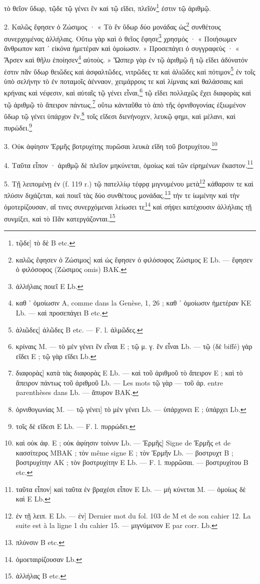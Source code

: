 \documentclass[a4paper, 11pt, oneside, polutonikogreek, french]{article}
\begin{document}
τὸ θεῖον ὕδωρ, τῷδε τῷ γένει ἓν καὶ τῷ εἴδει, πλεῖόν\footnote{τῷδε] τὸ δὲ B etc.} ἐστιν τῷ ἀριθμῷ.

2. Καλῶς ἔφησεν ὁ Ζώσιμος · « Τὸ ἓν ὕδωρ δύο μονάδας ὡς\footnote{καλῶς ἔφησεν ὁ Ζώσιμος] καὶ ὡς ἔφησεν ὁ φιλόσοφος Ζώσιμος E Lb. --- ἔφησεν ὁ φιλόσοφος (Ζώσιμος omis) BAK.} συνθέτους συνερχομένας ἀλλήλαις. Οὕτω γὰρ καὶ ὁ θεῖος ἔφησε\footnote{ἀλλήλαις ποιεῖ E Lb.} χρησμός · « Ποιήσωμεν ἄνθρωπον κατ ᾽ εἰκόνα ἡμετέραν καὶ ὁμοίωσιν. » Προσεπάγει ὁ συγγραφεὺς · « Ἄρσεν καὶ θῆλυ ἐποίησεν\footnote{καθ ᾽ ὁμοίωσιν A, comme dans la Genèse, 1, 26 ; καθ ᾽ ὁμοίωσιν ἡμετέραν KE Lb. --- καὶ προσεπάγει B etc.} αὐτοὺς. » Ὥσπερ γὰρ ἐν τῷ ἀριθμῷ ἢ τῷ εἴδει ἀδύνατόν ἐστιν πᾶν ὕδωρ θειῶδες καὶ ἀσφαλτῶδες, νιτρῶδες τε καὶ ἁλιῶδες καὶ πότιμον\footnote{ἁλιῶδες] ἁλῶδες B etc. --- F. l. ἁλμῶδες.} ἐν τοῖς ὑπὸ σελήνην τὸ ἐν ποταμοῖς ἀένναον, χειμάρροις τε καὶ λίμναις καὶ θαλάσσαις καὶ κρήναις καὶ νέφεσιν, καὶ αὐταῖς τῷ γένει εἶναι,\footnote{κρίναις M. --- τὸ μὲν γένει ἓν εἶναι E ; τῷ μ. γ. ἓν εἶναι Lb. --- τῷ (δὲ biffé) γὰρ εἴδει E ; τῷ γὰρ εἴδει Lb.} τῷ εἴδει πολλαχῶς ἔχει διαφορὰς καὶ τῷ ἀριθμῷ τὸ ἄπειρον πάντως,\footnote{διαφορὰς] κατὰ τὰς διαφορὰς E Lb. --- καὶ τοῦ ἀριθμοῦ τὸ ἄπειρον E ; καὶ τὸ ἄπειρον πάντως τοῦ ἀριθμοῦ Lb. --- Les mots τῷ γὰρ --- τοῦ ἀρ. entre parenthèses dans Lb. --- ἄπυρον BAK.} οὕτω κἀνταῦθα τὸ ἀπὸ τῆς ὀρνιθογονίας ἐξιωμένον ὕδωρ τῷ γένει ὑπάρχον ἓν,\footnote{ὀρνιθογωνίας M. --- τῷ γένει] τὸ μὲν γένει Lb. --- ὑπάρχονει E ; ὑπάρχει Lb.} τοῖς εἴδεσι διενήνοχεν, λευκῷ φημι, καὶ μέλανι, καὶ πυρώδει.\footnote{τοῖς δὲ εἴδεσι E Lb. --- F. l. πυρρώδει.}

3. Οὐκ ἀφίησιν Ἑρμῆς βοτρυχίτης πυρῶσαι λευκὰ εἴδη τοῦ βοτρυχίτου.\footnote{καὶ οὐκ ἀφ. E ; οὐκ ἀφίησιν τοίνυν Lb. --- Ἑρμῆς] Signe de Ἐρμῆς et de κασσίτερος MBAK ; τὸν même signe E ; τὸν Ἑρμῆν Lb. --- βοστρυχτ B ; βοστρυχίτην AK ; τὸν βοστρυχίτην E Lb. --- F. l. πυρρῶσαι. --- βοστρυχίτου B etc.}

4. Ταῦτα εἶπον · ἀριθμῷ δὲ πλεῖον μηκύνεται, ὁμοίως καὶ τῶν εἰρημένων ἕκαστον.\footnote{ταῦτα εἶπον] καὶ ταῦτα ἐν βραχέσι εἶπον E Lb. --- μὴ κύνεται M. --- ὁμοίως δὲ καὶ E Lb.}

5. Τῇ λειπομένῃ ἐν (f. 119 r.) τῷ πατελλίῳ τέφρᾳ μιγνυμένου μετὰ\footnote{ἐν τῇ λειπ. E Lb. --- ἐν] Dernier mot du fol. 103 de M et de son cahier 12. La suite est à la ligne 1 du cahier 15. --- μιγνύμενον E par corr. Lb.} κάθαρσιν τε καὶ πλύσιν διχάζεται, καὶ ποιεῖ τὰς δύο συνθέτους μονάδας,\footnote{πλύνσιν B etc.} τήν τε ἰωμένην καὶ τὴν ὁμοτερίζουσαν, αἵ τινες συνερχόμεναι λείωσει τε\footnote{ὁμοεταιρίζουσαν Lb.} καὶ σήψει κατέχουσιν ἀλλήλαις τῇ συνμίξει, καὶ τὸ Πᾶν κατεργάζονται.\footnote{ἀλλήλας B etc.}
\end{document}

